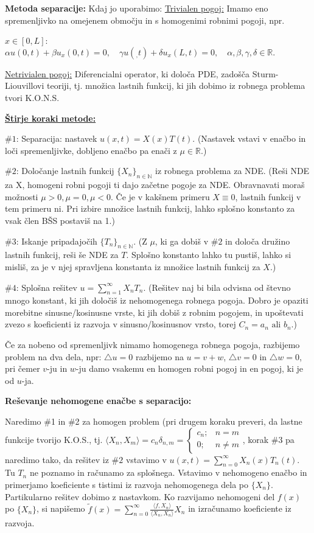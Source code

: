 \documentclass[10pt,a4paper]{amsart}
\theoremstyle{definition} %
\theoremstyle{plain} %
\newcommand{\R}{\mathbb R}
\newcommand{\N}{\mathbb N}
\begin{document}
\textbf{Metoda separacije:} Kdaj jo uporabimo: \underline{Trivialen pogoj:}
Imamo eno spremenljivko na omejenem območju in s homogenimi robnimi pogoji, npr.

$x \in [0,L]$: $\alpha u(0,t) + \beta u_x(0,t) = 0, \quad \gamma u(_,t)+\delta
u_x(L,t) = 0, \quad \alpha, \beta, \gamma, \delta \in \R.$

\underline{Netrivialen pogoj:} Diferencialni operator, ki določa PDE, zadošča
Sturm-Liouvillovi teoriji, tj. množica lastnih funkcij, ki jih dobimo iz robnega
problema tvori K.O.N.S.


\underline{\textbf{Štirje koraki metode:}}

$\#1$: Separacija: nastavek $u(x,t)=X(x)T(t)$. (Nastavek vstavi v enačbo in loči
spremenljivke, dobljeno enačbo pa enači z $\mu \in \R$.)

$\#2$: Določanje lastnih funkcij $\{X_n\}_{n\in \N}$ iz robnega problema za NDE.
(Reši NDE za X, homogeni robni pogoji ti dajo začetne pogoje za NDE. Obravnavati
moraš možnosti $\mu >0, \mu = 0, \mu < 0$. Če je v kakšnem primeru $X \equiv 0$,
lastnih funkcij v tem primeru ni. Pri izbire množice lastnih funkcij, lahko
splošno konstanto za vsak člen BŠS postaviš na 1.)

$\#3$: Iskanje pripadajočih $\{T_n \}_{n \in \N}$. (Z $\mu$, ki ga dobiš v $\#2$
in določa družino lastnih funkcij, reši še NDE za $T$. Splošno konstanto lahko
tu pustiš, lahko si misliš, za je v njej spravljena konstanta iz množice lastnih
funkcij za $X$.)

$\#4$: Splošna rešitev $u = \sum_{n=1}^\infty X_nT_n$. (Rešitev naj bi bila
odvisna od števno mnogo konstant, ki jih določiš iz nehomogenega robnega pogoja.
Dobro je opaziti morebitne sinusne/kosinusne vrste, ki jih dobiš z robnim
pogojem, in upoštevati zvezo s koeficienti iz razvoja v sinusno/kosinusnov
vrsto, torej $C_n = a_n \text{ ali } b_n$.)

Če za nobeno od spremenljivk nimamo homogenega robnega pogoja, razbijemo problem
na dva dela, npr: $\triangle u = 0$ razbijemo na $u = v+w$, $\triangle v = 0$ in
$\triangle w = 0$, pri čemer $v$-ju in $w$-ju damo vsakemu en homogen robni
pogoj in en pogoj, ki je od $u$-ja.

\textbf{Reševanje nehomogene enačbe s separacijo:}

Naredimo $\#$1 in $\#$2 za homogen problem (pri drugem koraku preveri, da lastne funkcije tvorijo K.O.S., tj. $\langle X_n,X_m \rangle = c_n \delta_{n,m} = \begin{cases} c_n; & n = m \\ 0; & n \neq m \end{cases}$, korak $\#$3 pa naredimo tako, da rešitev iz $\#2$ vstavimo v $u(x,t) = \sum_{n=0}^\infty X_n(x)T_n(t)$. Tu $T_n$ ne poznamo in računamo za splošnega. Vstavimo v nehomogeno enačbo in primerjamo koeficiente s tistimi iz razvoja nehomogenega dela po $\{X_n\}$. Partikularno rešitev dobimo z nastavkom. Ko razvijamo nehomogeni del $f(x)$ po $\{X_n\}$, si napišemo $\tilde{f}(x) = \sum_{n=0}^\infty \frac{\langle f,X_n \rangle}{\langle X_n,X_n \rangle}X_n$ in izračunamo koeficiente iz razvoja.
\end{document}
